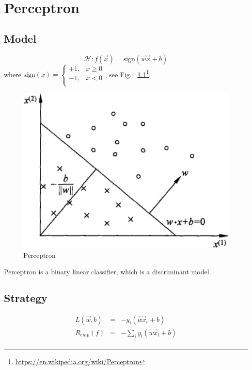 \chapter{Perceptron}
\label{chap:Perceptron}

\section{Model}
\begin{equation}
\mathcal{H}:f(\vec{x})=\text{sign}(\vec{w}\vec{x}+b)
\end{equation}
where $\text{sign}(x)=\begin{cases}+1, & x \geq 0\\-1, & x<0\\\end{cases}$, see Fig. ~\ref{fig:perceptron}\footnote{\url{https://en.wikipedia.org/wiki/Perceptron}}.
\begin{figure}[hbtp]
\centering
    \includegraphics[scale=.50]{figures/perceptron.png}
\caption{Perceptron}
\label{fig:perceptron} 
\end{figure}

Perceptron is a binary linear classifier, which is a discriminant model.

\section{Strategy}
\begin{eqnarray}
L(\vec{w},b)&=&-y_i(\vec{wx}_i+b)\\
R_{emp}(f)&=&-\sum\limits_i y_i(\vec{wx}_i+b)\\
\end{eqnarray}

